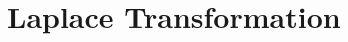 \documentclass[./\jobname.tex]{subfiles}
\begin{document}
\chapter{Laplace Transformation}
\end{document}
